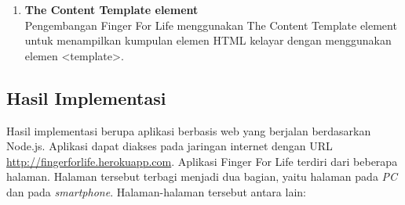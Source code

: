 \begin{enumerate}
\begin{enumerate}
\begin{enumerate}
			\item \textbf{The Content Template element} \\
			Pengembangan Finger For Life menggunakan The Content Template element untuk menampilkan kumpulan elemen HTML kelayar dengan menggunakan elemen <template>. 
			
		\end{enumerate}
	\end{enumerate}
	
\end{enumerate}

\subsection{Hasil Implementasi}

Hasil implementasi berupa aplikasi berbasis web yang berjalan berdasarkan Node.js. Aplikasi dapat diakses pada jaringan internet dengan URL \url{http://fingerforlife.herokuapp.com}. Aplikasi Finger For Life terdiri dari beberapa halaman. Halaman tersebut terbagi menjadi dua bagian, yaitu halaman pada \textit{PC} dan pada \textit{smartphone}. Halaman-halaman tersebut antara lain:

